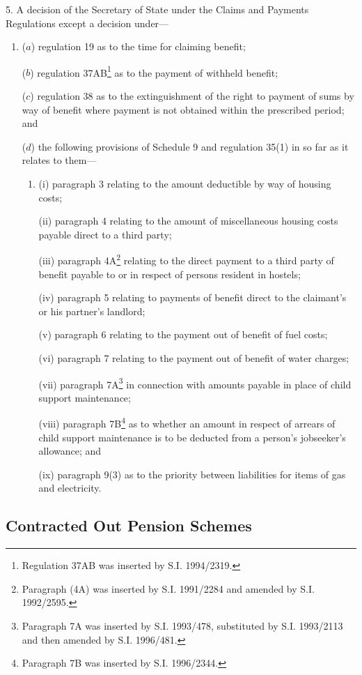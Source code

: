 \documentclass[12pt,a4paper]{article}
\begin{document}
5.  A decision of the Secretary of State under the Claims and Payments Regulations except a decision under—
\begin{enumerate}\item[]
($a$) regulation 19 as to the time for claiming benefit;

($b$) regulation 37AB\footnote{\frenchspacing Regulation 37AB was inserted by S.I. 1994/2319.} as to the payment of withheld benefit;

($c$) regulation 38 as to the extinguishment of the right to payment of sums by way of benefit where payment is not obtained within the prescribed period; and

($d$) the following provisions of Schedule 9 and regulation 35(1) in so far as it relates to them—
\begin{enumerate}\item[]
(i) paragraph 3 relating to the amount deductible by way of housing costs;

(ii) paragraph 4 relating to the amount of miscellaneous housing costs payable direct to a third party;

(iii) paragraph 4A\footnote{\frenchspacing Paragraph (4A) was inserted by S.I. 1991/2284 and amended by S.I. 1992/2595.} relating to the direct payment to a third party of benefit payable to or in respect of persons resident in hostels;

(iv) paragraph 5 relating to payments of benefit direct to the claimant’s or his partner’s landlord;

(v) paragraph 6 relating to the payment out of benefit of fuel costs;

(vi) paragraph 7 relating to the payment out of benefit of water charges;

(vii) paragraph 7A\footnote{\frenchspacing Paragraph 7A was inserted by S.I. 1993/478, substituted by S.I. 1993/2113 and then amended by S.I. 1996/481.} in connection with amounts payable in place of child support maintenance;

(viii) paragraph 7B\footnote{\frenchspacing Paragraph 7B was inserted by S.I. 1996/2344.} as to whether an amount in respect of arrears of child support maintenance is to be deducted from a person’s jobseeker’s allowance; and

(ix) paragraph 9(3) as to the priority between liabilities for items of gas and electricity.
\end{enumerate}
\end{enumerate}

\subsection*{Contracted Out Pension Schemes}
\end{document}
